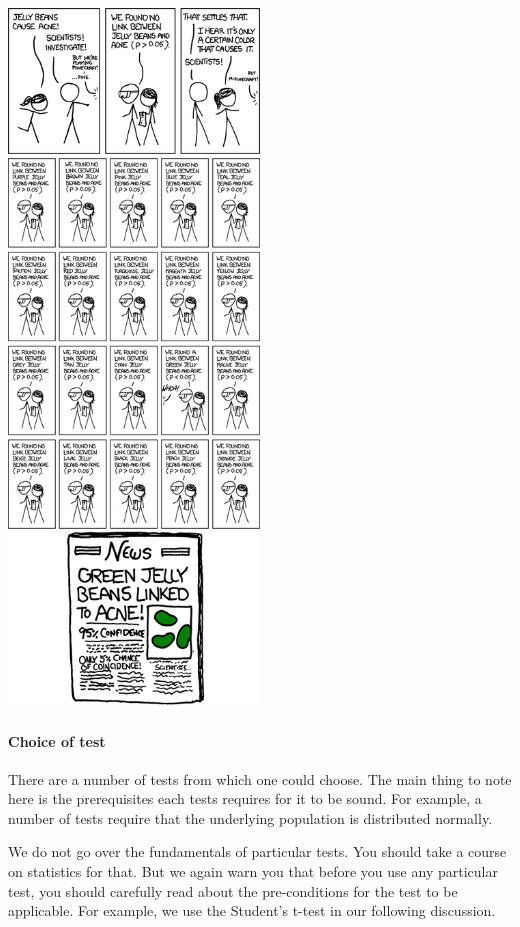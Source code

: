 \begin{center}
\includegraphics[width=0.5\textwidth]{images/significant.png}~\cite{xkcd:significance}
\end{center}

\paragraph{Choice of test} There are a number of tests from
which one could choose. The main thing to note here is the
prerequisites each tests requires for it to be sound.
For example, a number of tests require that the underlying
population is distributed normally.

We do not go over the fundamentals of particular tests. You
should take a course on statistics for that. But we again
warn you that before you use any particular test, you should
carefully read about the pre-conditions for the test to be
applicable. For example, we use the Student's t-test in
our following discussion. 

